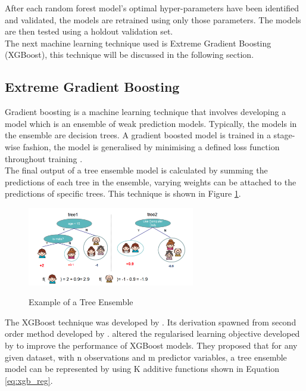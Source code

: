 After each random forest model's optimal hyper-parameters have been identified and validated, the models are retrained using only those parameters. The models are then tested using a holdout validation set. \\

The next machine learning technique used is Extreme Gradient Boosting (XGBoost), this technique will be discussed in the following section. 

\subsection{Extreme Gradient Boosting}

Gradient boosting is a machine learning technique that involves developing a model which is an ensemble of weak prediction models. Typically, the models in the ensemble are decision trees. A gradient boosted model is trained in a stage-wise fashion, the model is generalised by minimising a defined loss function throughout training \parencite{Boosting}.   \\

The final output of a tree ensemble model is calculated by summing the predictions of each tree in the ensemble, varying weights can be attached to the predictions of specific trees. This technique is shown in Figure \ref{fig:tree_ens}. \\

\vspace{10 pt}

\begin{figure}[!htb]
\centering
\includegraphics[width=0.65\textwidth]{images/tree_ensemble.png}
\caption{Example of a Tree Ensemble}
\label{fig:tree_ens}
\parencite{XGBoost}
\end{figure}

\vspace{10 pt}

The XGBoost technique was developed by \textcite{XGBoost}. Its derivation spawned from second order method developed by \textcite{Boosting}. \textcite{XGBoost} altered the regularised learning objective developed by \textcite{Boosting} to improve the performance of XGBoost models. They proposed that for any given dataset, with n observations and m predictor variables, a tree ensemble model can be represented by using K additive functions  shown in Equation \ref{eq:xgb_reg}. 

